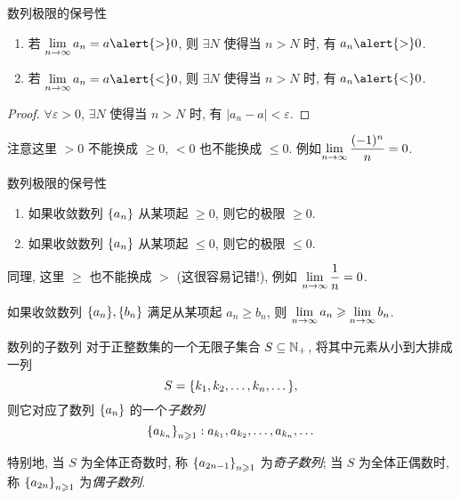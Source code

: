 \begin{frame}{数列极限的保号性}
	\onslide<+->
	\begin{theorem}[保号性]
		\begin{enumerate}
			\item 若 $\lim\limits_{n\ra\infty}a_n=a\alert{>}0$, 则 $\exists N$ 使得当 $n>N$ 时, 有 $a_n\alert{>}0$.
			\item 若 $\lim\limits_{n\ra\infty}a_n=a\alert{<}0$, 则 $\exists N$ 使得当 $n>N$ 时, 有 $a_n\alert{<}0$.
		\end{enumerate}
	\end{theorem}
	\onslide<+->
	\begin{proof}
		 $\forall\varepsilon>0$, $\exists N$ 使得当 $n>N$ 时, 有 $|a_n-a|<\varepsilon$.
		\onslide<+->{\enumnum2 同理可得.\qedhere}
	\end{proof}
	\onslide<+->
	注意这里 $>0$ \alert{不能换成} $\ge 0$,	$<0$ 也\alert{不能换成} $\le 0$.
	\onslide<+->
	例如$\lim\limits_{n\rightarrow\infty}\dfrac{(-1)^n}n=0$.
\end{frame}


\begin{frame}{数列极限的保号性}
	\onslide<+->
	\begin{corollary}[逆否命题]
		\begin{enumerate}
			\item 如果收敛数列 ${\left\{a_n\right\}}$ 从某项起 $\ge 0$, 则它的极限 $\ge 0$.
			\item 如果收敛数列 ${\left\{a_n\right\}}$ 从某项起 $\le 0$, 则它的极限 $\le 0$.
		\end{enumerate}
	\end{corollary}
	\onslide<+->
	同理, 这里 $\ge$ 也不能换成 $>$ (\alert{这很容易记错!}), 例如 $\lim\limits_{n\rightarrow\infty}\dfrac1n=0$.
	\onslide<+->
	\begin{corollary}
		如果收敛数列 ${\left\{a_n\right\}}, {\left\{b_n\right\}}$ 满足从某项起 $a_n\ge b_n$, 则 $\lim\limits_{n\rightarrow\infty}a_n\geqslant\lim\limits_{n\rightarrow\infty}b_n$.
	\end{corollary}
\end{frame}


\begin{frame}{数列的子数列}
	\onslide<+->
	对于正整数集的一个无限子集合 $S\subseteq{\mathbb{N}}_+$, 将其中元素从小到大排成一列
	\[S={\left\{k_1,k_2,\dots,k_n,\dots\right\}},\]
	\onslide<+->
	则它对应了数列 ${\left\{a_n\right\}}$ 的一个\emph{子数列}
	\[{\left\{a_{k_n}\right\}}_{n\geqslant1}: a_{k_1}, a_{k_2}, \dots, a_{k_n}, \dots\]

	\onslide<+->
	特别地, 当 $S$ 为全体正奇数时, 称 ${\left\{a_{2n-1}\right\}}_{n\geqslant1}$ 为\emph{奇子数列}; 当 $S$ 为全体正偶数时, 称 ${\left\{a_{2n}\right\}}_{n\geqslant1}$ 为\emph{偶子数列}.
\end{frame}


